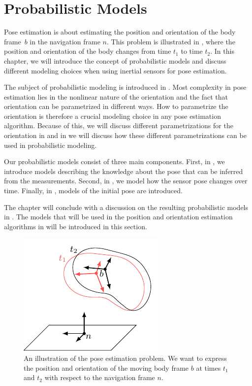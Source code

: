 \chapter{Probabilistic Models}
\label{cha:models} 
Pose estimation is about estimating the position and orientation of the body frame~$b$ in the navigation frame $n$. This problem is illustrated in , where the position and orientation of the body changes from time $t_1$ to time $t_2$. In this chapter, we will introduce the concept of probabilistic models and discuss different modeling choices when using inertial sensors for pose estimation. 

The subject of probabilistic modeling is introduced in . Most complexity in pose estimation lies in the nonlinear nature of the orientation and the fact that orientation can be parametrized in different ways. How to parametrize the orientation is therefore a crucial modeling choice in any pose estimation algorithm. Because of this, we will discuss different parametrizations for the orientation in  and in  we will discuss how these different parametrizations can be used in probabilistic modeling. 

Our probabilistic models consist of three main components. First, in , we introduce models describing the knowledge about the pose that can be inferred from the measurements. Second, in , we model how the sensor pose changes over time. Finally, in , models of the initial pose are introduced. 

The chapter will conclude with a discussion on the resulting probabilistic models in . The models that will be used in the position and orientation estimation algorithms in  will be introduced in this section.

\begin{figure}
  	\centering
    	\includegraphics[scale = 1]{figure3_1.pdf}
    	\caption{An illustration of the pose estimation problem. We want to express the position and orientation of the moving body frame $b$ at times $t_1$ and $t_2$ with respect to the navigation frame $n$.}
    	\label{fig:models-poseEstimation}
\end{figure}

